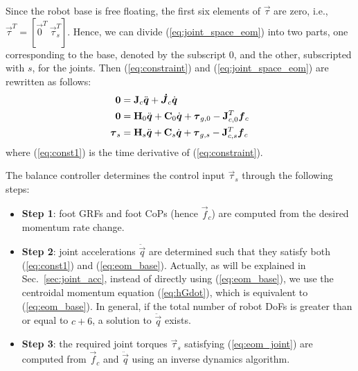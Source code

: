 \documentclass{llncs}
\newcommand{\mdJ} 	{\boldsymbol{\dot{J}}}
\newcommand {\mat}[1] {{\bf #1}}
\newcommand{\mC} {\mat{C}}
\newcommand{\mH} {\mat{H}}
\newcommand{\mJ} {\mat{J}}
\newcommand{\vtau}{\vec{\tau}}
\newcommand{\vzero}{{\vec{0}}}
\newcommand{\vf}{\vec{f}}
\newcommand{\vdq} {\dot{\vec{q}}}
\newcommand{\vddq} {\ddot{\vec{q}}}
\begin{document}
Since the robot base is free floating, the first six elements of $\vtau$ are zero,
i.e., $\vtau^T = [ \vec{0}^T~ \vtau_s^T ]$.
Hence, we can divide (\ref{eq:joint_space_eom}) into two parts, one corresponding to the base, denoted by the subscript 0, and the other, subscripted with $s$, for the joints.
Then (\ref{eq:constraint}) and (\ref{eq:joint_space_eom}) are rewritten as follows:
\begin{align}
	\vzero &= \mJ_c\vddq + \mdJ_c \vdq \label{eq:const1}\\
	\vzero &= \mH_0 \vddq + \mC_0\vdq  + \vtau_{g,0} - \mJ_{c,0}^T \vf_c \label{eq:eom_base}\\
	\vtau_s &= \mH_s \vddq + \mC_s\vdq  + \vtau_{g,s} - \mJ_{c,s}^T\vf_c \label{eq:eom_joint}
\end{align}
where (\ref{eq:const1}) is the time derivative of (\ref{eq:constraint}).

The balance controller determines the control input $\vtau_s$
through the following steps:
\begin{itemize}
	\item {\bf Step 1}: foot GRFs and foot CoPs (hence $\vf_c$) are computed
	   from the desired momentum rate change.
	\item {\bf Step 2}: joint accelerations $\vddq$ are determined
	   such that they satisfy both (\ref{eq:const1}) and (\ref{eq:eom_base}).
        Actually, as will be explained in Sec.~\ref{sec:joint_acc}, instead of
        directly using (\ref{eq:eom_base}), we use the centroidal momentum
        equation (\ref{eq:hGdot}), which is equivalent to (\ref{eq:eom_base}). In general, if the total number of robot DoFs is greater
        than or equal to $c+6$, a solution to $\vddq$ exists.
	\item {\bf Step 3}: the required joint torques $\vtau_s$ satisfying
	   (\ref{eq:eom_joint}) are computed from $\vf_c$ and $\vddq$ using
        an inverse dynamics algorithm.
	\label{it:steps}
\end{itemize}
\end{document}
